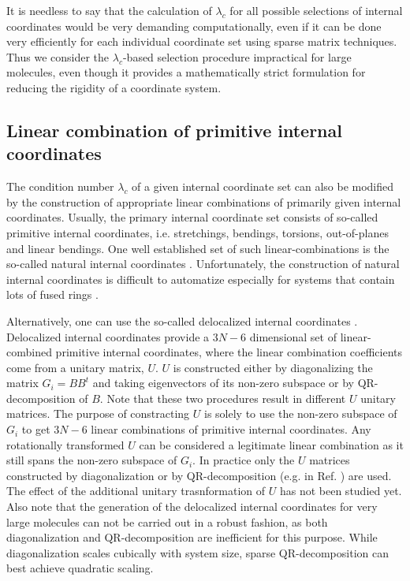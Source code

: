 \documentclass[prl,aps,preprint,superbib,12pt]{revtex4}
\begin{document}
It is needless to say that the calculation of $\lambda_{c}$
for all possible selections of internal coordinates would be 
very demanding computationally, even if it can be done very efficiently
for each individual coordinate set using sparse matrix techniques.
Thus we consider the $\lambda_{c}$-based
selection procedure impractical for large molecules, even though it
provides a mathematically strict formulation for reducing the rigidity
of a coordinate system.

\subsection{Linear combination of primitive internal coordinates}
The condition number $\lambda_{c}$ of a given internal coordinate set
can also be modified by the construction of appropriate linear 
combinations of primarily given internal coordinates. Usually, the
primary internal coordinate set consists of so-called primitive
internal coordinates, i.e. stretchings, bendings, torsions,
out-of-planes and linear bendings. One well established set of such
linear-combinations is the so-called natural internal coordinates
\cite{GFogarasi92,MvonArnim99}. Unfortunately, the construction
of natural internal coordinates is difficult to 
automatize especially for systems that contain
lots of fused rings \cite{BPaizs00}. 

Alternatively, one can use the so-called delocalized
internal coordinates \cite{JBaker96}. Delocalized internal coordinates
provide a $3N-6$ dimensional set of linear-combined primitive
internal coordinates, where the linear combination coefficients
come from a unitary matrix, $U$. $U$ is constructed either by
diagonalizing the matrix $G_{i}=BB^{t}$ and taking eigenvectors of 
its non-zero subspace or by QR-decomposition of
$B$. Note that these two procedures result in different $U$ unitary 
matrices. The purpose of constracting $U$ is solely to use
the non-zero subspace of $G_{i}$ to get $3N-6$ linear combinations
of primitive internal coordinates. Any rotationally transformed
$U$ can be considered a legitimate linear combination as it still spans
the non-zero subspace of $G_{i}$. In practice 
only the $U$ matrices constructed by diagonalization 
\cite{JBaker96,JAndzelm92} or 
by QR-decomposition (e.g. in Ref. )
are used. The effect of the additional unitary trasnformation 
of $U$ has not been studied yet. Also note that the generation of
the delocalized internal coordinates for very large molecules 
can not be carried out in a robust fashion,
as both diagonalization and QR-decomposition are
inefficient for this purpose. While diagonalization scales cubically
with system size, sparse QR-decomposition can best achieve 
quadratic scaling.
\end{document}
